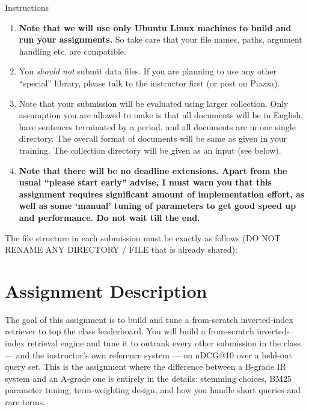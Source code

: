 \documentclass[10pt]{article}
\newcommand{\eat}[1]{}
\begin{document}
\begin{exbox}{Instructions}
{\begin{enumerate}
 \item \textbf{Note that we will use only Ubuntu Linux machines to build and run your assignments.} So take care that your file names, paths, argument handling etc. are compatible.
\item You \emph{should not} submit data files. If you are planning to use any other ``special'' library, please talk to the instructor first (or post on Piazza). 
\item Note that your submission will be evaluated using larger collection. Only assumption you are allowed to make is that all documents will be in English, have sentences terminated by a period, \eat{each document is a separate file, }and all documents are in one single directory. The overall format of documents will be same as given in your training. The collection directory will be given as an input (see below).
\item \textbf{Note that there will be no deadline extensions. Apart from the usual ``please start early'' advise, I must warn you that this assignment requires significant amount of implementation effort, as well as some `manual' tuning of parameters to get good speed up and performance. Do not wait till the end.}
\end{enumerate}
}
The file structure in each submission must be exactly as follows (DO NOT RENAME ANY DIRECTORY / FILE that is already shared): 


\end{exbox}

\section{Assignment Description}

The goal of this assignment is to build and tune a from-scratch inverted-index retriever to top the class leaderboard.  You will build a from-scratch inverted-index retrieval engine and tune it to outrank every other submission in the class — and the instructor's own reference system — on nDCG@10 over a held-out query set. This is the assignment where the difference between a B-grade IR system and an A-grade one is entirely in the details: stemming choices, BM25 parameter tuning, term-weighting design, and how you handle short queries and rare terms.
\end{document}
